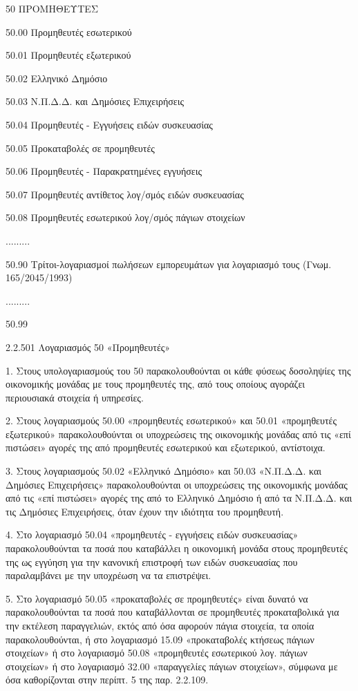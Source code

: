 \documentclass[A4,10pt,greek]{book}
\begin{document}
 50   ΠΡΟΜΗΘΕΥΤΕΣ

        50.00   Προμηθευτές εσωτερικού

        50.01   Προμηθευτές εξωτερικού

        50.02   Ελληνικό Δημόσιο

        50.03   Ν.Π.Δ.Δ. και Δημόσιες Επιχειρήσεις

        50.04   Προμηθευτές - Εγγυήσεις ειδών συσκευασίας

        50.05   Προκαταβολές σε προμηθευτές

        50.06   Προμηθευτές - Παρακρατημένες εγγυήσεις

        50.07   Προμηθευτές αντίθετος λογ/σμός ειδών συσκευασίας

        50.08   Προμηθευτές εσωτερικού λογ/σμός πάγιων στοιχείων

        .........

        50.90   Τρίτοι-λογαριασμοί πωλήσεων εμπορευμάτων για λογαριασμό τους
                    (Γνωμ. 165/2045/1993)

        .........

        50.99


 

2.2.501 Λογαριασμός 50 «Προμηθευτές»

1. Στους υπολογαριασμούς του 50 παρακολουθούνται οι κάθε φύσεως δοσοληψίες της οικονομικής μονάδας με τους προμηθευτές της, από τους οποίους αγοράζει περιουσιακά στοιχεία ή υπηρεσίες.

2. Στους λογαριασμούς 50.00 «προμηθευτές εσωτερικού» και 50.01 «προμηθευτές εξωτερικού» παρακολουθούνται οι υποχρεώσεις της οικονομικής μονάδας από τις «επί πιστώσει» αγορές της από προμηθευτές εσωτερικού και εξωτερικού, αντίστοιχα.

3. Στους λογαριασμούς 50.02 «Ελληνικό Δημόσιο» και 50.03 «Ν.Π.Δ.Δ. και Δημόσιες Επιχειρήσεις» παρακολουθούνται οι υποχρεώσεις της οικονομικής μονάδας από τις «επί πιστώσει» αγορές της από το Ελληνικό Δημόσιο ή από τα Ν.Π.Δ.Δ. και τις Δημόσιες Επιχειρήσεις, όταν έχουν την ιδιότητα του προμηθευτή.

4. Στο λογαριασμό 50.04 «προμηθευτές - εγγυήσεις ειδών συσκευασίας» παρακολουθούνται τα ποσά που καταβάλλει η οικονομική μονάδα στους προμηθευτές της ως εγγύηση για την κανονική επιστροφή των ειδών συσκευασίας που παραλαμβάνει με την υποχρέωση να τα επιστρέψει.

5. Στο λογαριασμό 50.05 «προκαταβολές σε προμηθευτές» είναι δυνατό να παρακολουθούνται τα ποσά που καταβάλλονται σε προμηθευτές προκαταβολικά για την εκτέλεση παραγγελιών, εκτός από όσα αφορούν πάγια στοιχεία, τα οποία παρακολουθούνται, ή στο λογαριασμό 15.09 «προκαταβολές κτήσεως πάγιων στοιχείων» ή στο λογαριασμό 50.08 «προμηθευτές εσωτερικού λογ. πάγιων στοιχείων» ή στο λογαριασμό 32.00 «παραγγελίες πάγιων στοιχείων», σύμφωνα με όσα καθορίζονται στην περίπτ. 5 της παρ. 2.2.109.
\end{document}
